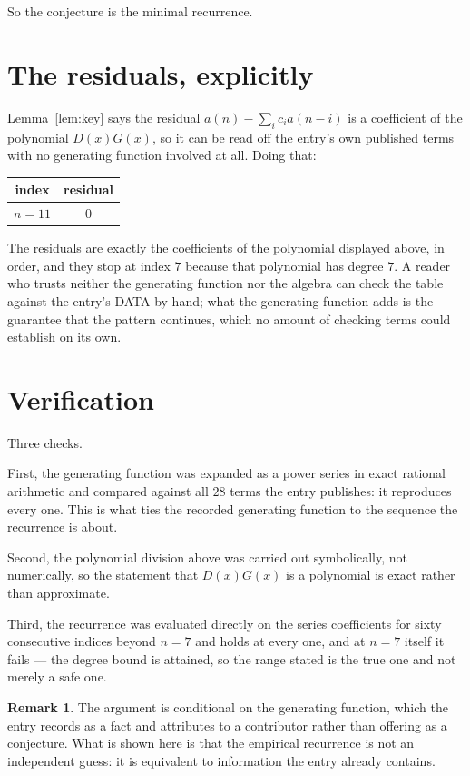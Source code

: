 \documentclass[11pt,a4paper]{article}
\theoremstyle{plain}
\theoremstyle{definition}
\newtheorem{remark}[theorem]{Remark}
\begin{document}
So the conjecture is the minimal recurrence.

\section{The residuals, explicitly}

Lemma~\ref{lem:key} says the residual $a(n)-\sum_ic_ia(n-i)$ is a coefficient of the
polynomial $D(x)G(x)$, so it can be read off the entry's own published terms with no
generating function involved at all. Doing that:
\begin{center}
\begin{tabular}{cc}
index & residual \\ \hline
$n=11$ & $0$
\end{tabular}
\end{center}
The residuals are exactly the coefficients of the polynomial displayed above, in order, and
they stop at index $7$ because that polynomial has degree $7$. A reader who trusts
neither the generating function nor the algebra can check the table against the entry's DATA
by hand; what the generating function adds is the guarantee that the pattern continues, which
no amount of checking terms could establish on its own.

\section{Verification}

Three checks.

First, the generating function was expanded as a power series in exact rational arithmetic and
compared against all $28$ terms the entry publishes: it reproduces every one. This is
what ties the recorded generating function to the sequence the recurrence is about.

Second, the polynomial division above was carried out symbolically, not numerically, so the
statement that $D(x)G(x)$ is a polynomial is exact rather than approximate.

Third, the recurrence was evaluated directly on the series coefficients for sixty consecutive
indices beyond $n=7$ and holds at every one, and at $n=7$ itself it fails --- the
degree bound is attained, so the range stated is the true one and not merely a safe one.

\begin{remark}
The argument is conditional on the generating function, which the entry records as a fact and
attributes to a contributor rather than offering as a conjecture. What is shown here is that
the empirical recurrence is not an independent guess: it is equivalent to information the
entry already contains.
\end{remark}
\end{document}
